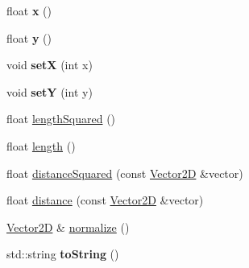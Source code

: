 \begin{DoxyCompactItemize}
\item 
\hypertarget{class_vector2_d_a29cb2b66aecab3e19ff8a1de1c0dd0f5}{float {\bfseries x} ()}\label{class_vector2_d_a29cb2b66aecab3e19ff8a1de1c0dd0f5}

\item 
\hypertarget{class_vector2_d_acc67a7592192dfecfd662527c9882866}{float {\bfseries y} ()}\label{class_vector2_d_acc67a7592192dfecfd662527c9882866}

\item 
\hypertarget{class_vector2_d_a6bfa4018566afb74620d25a2006dff6d}{void {\bfseries set\-X} (int x)}\label{class_vector2_d_a6bfa4018566afb74620d25a2006dff6d}

\item 
\hypertarget{class_vector2_d_ad6d73989863b8f84da79001f1b60e7c6}{void {\bfseries set\-Y} (int y)}\label{class_vector2_d_ad6d73989863b8f84da79001f1b60e7c6}

\item 
float \hyperlink{class_vector2_d_a3abc9ba8cd86167ca860c9cf8a4d4155}{length\-Squared} ()
\item 
float \hyperlink{class_vector2_d_ae9c6666151cd09a233f35c13cdfd9049}{length} ()
\item 
float \hyperlink{class_vector2_d_a93d8b715cbf485be515754d664a59532}{distance\-Squared} (const \hyperlink{class_vector2_d}{Vector2\-D} \&vector)
\item 
float \hyperlink{class_vector2_d_affaea33a9b0a2a34682a8ff747280afb}{distance} (const \hyperlink{class_vector2_d}{Vector2\-D} \&vector)
\item 
\hyperlink{class_vector2_d}{Vector2\-D} \& \hyperlink{class_vector2_d_a96df07b103215d138c68210764d8bf07}{normalize} ()
\item 
\hypertarget{class_vector2_d_ae031a1b3f3706f9cf0d20c751409c87c}{std\-::string {\bfseries to\-String} ()}\label{class_vector2_d_ae031a1b3f3706f9cf0d20c751409c87c}

\end{DoxyCompactItemize}


